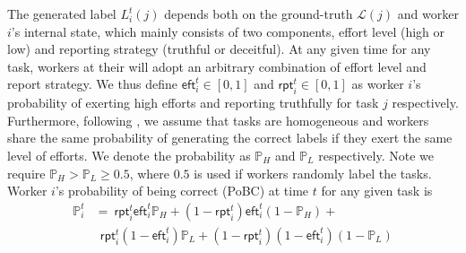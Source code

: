 The generated label $L^{t}_{i}(j)$ depends both on the ground-truth $\mathcal{L}(j)$ and worker $i$'s internal state, which mainly consists of two components, effort level (high or low) and reporting strategy (truthful or deceitful).
At any given time for any task, workers at their will adopt an arbitrary combination of effort level and report strategy. We thus define $\textsf{eft}^{t}_i\in[0,1]$ and $\textsf{rpt}^{t}_i\in[0,1]$ as worker $i$'s probability of exerting high efforts and reporting truthfully for task $j$ %
respectively. Furthermore, following \citet{dasgupta2013crowdsourced,liu2017sequential}, we assume that tasks are homogeneous and workers share the same probability of generating the correct labels if they exert the same level of efforts. We denote the probability as $\mathbb{P}_{H}$ and $\mathbb{P}_{L}$ respectively. Note we require $\mathbb{P}_{H} > \mathbb{P}_{L} \geq 0.5$, where $0.5$ is used if workers randomly label the tasks. Worker $i$'s probability of being correct (PoBC) at time $t$ for any given task is 
\begin{equation}
\begin{split}
\mathbb{P}^{t}_i  &= ~\textsf{rpt}^{t}_i \textsf{eft}^{t}_i \mathbb{P}_{H}+ (1-\textsf{rpt}^{t}_i) \textsf{eft}^{t}_i (1-\mathbb{P}_{ H})+\\
&~~\textsf{rpt}^{t}_i (1-\textsf{eft}^{t}_i) \mathbb{P}_{L}+(1-\textsf{rpt}^{t}_i) (1-\textsf{eft}^{t}_i) (1-\mathbb{P}_{L})
\end{split}
\end{equation}

